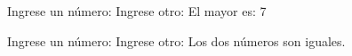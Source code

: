 \vspace{-1ex}


\begin{exampleConsole}
Ingrese un número: 
Ingrese otro: 
El mayor es: 7
\end{exampleConsole}

\fullrule


\begin{exampleConsole}
Ingrese un número: 
Ingrese otro: 
Los dos números son iguales.
\end{exampleConsole}

\trmcolumns
